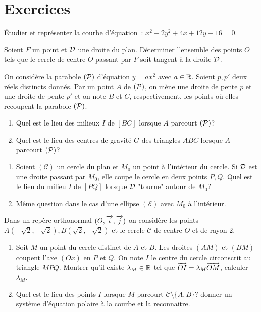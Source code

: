\section{Exercices}
\begin{exercice}
    Étudier et représenter la courbe d'équation~: \(x^2-2y^2+4x+12y-16=0\).
\end{exercice}
\begin{exercice}
    Soient \(F\) un point et \(\Dr\) une droite du plan. Déterminer l'ensemble des points \(O\) tels que le cercle de centre \(O\) passant par \(F\) soit tangent à la droite \(\Dr\).
\end{exercice}
\begin{exercice}
    On considère la parabole \((\P)\) d'équation \(y=ax^2\) avec \(a \in \R\). Soient \(p, p'\) deux réels distincts donnés. Par un point \(A\) de \((\P)\), on mène une droite de pente \(p\) et une droite de pente \(p'\) et on note \(B\) et \(C\), respectivement, les points où elles recoupent la parabole \((\P)\).
    \begin{enumerate}
        \item Quel est le lieu des milieux \(I\) de \([BC]\) lorsque \(A\) parcourt \((\P)\)?
        \item Quel est le lieu des centres de gravité \(G\) des triangles \(ABC\) lorsque \(A\) parcourt \((\P)\)?
    \end{enumerate}
\end{exercice}
\begin{exercice}
    \begin{enumerate}
        \item Soient \((\mathcal{C})\) un cercle du plan et \(M_0\) un point à l'intérieur du cercle. Si \(\Dr\) est une droite passant par \(M_0\), elle coupe le cercle en deux points \(P, Q\). Quel est le lieu du milieu \(I\) de \([PQ]\) lorsque \(\Dr\) "tourne" autour de \(M_0\)?
        \item Même question dans le cas d'une ellipse \((\mathcal{E})\) avec \(M_0\) à l'intérieur.
    \end{enumerate}
\end{exercice}
\begin{exercice}
    Dans un repère orthonormal \((O, \vi, \vj)\) on considère les points \(A(-\sqrt{2}, -\sqrt{2}), B(\sqrt{2}, -\sqrt{2})\) et le cercle \(\mathcal{C}\) de centre \(O\) et de rayon \(2\).
    \begin{enumerate}
        \item Soit \(M\) un point du cercle distinct de \(A\) et \(B\). Les droites \((AM)\) et \((BM)\) coupent l'axe \((Ox)\) en \(P\) et \(Q\). On note \(I\) le centre du cercle circonscrit au triangle \(MPQ\). Montrer qu'il existe \(\lambda_M \in \R\) tel que \(\vect{OI} = \lambda_M \vect{OM}\), calculer \(\lambda_M\).
        \item Quel est le lieu des points \(I\) lorsque \(M\) parcourt \(\mathcal{C}\setminus\{A, B\}\)? donner un système d'équation polaire à la courbe et la reconnaitre.
    \end{enumerate}
\end{exercice}
